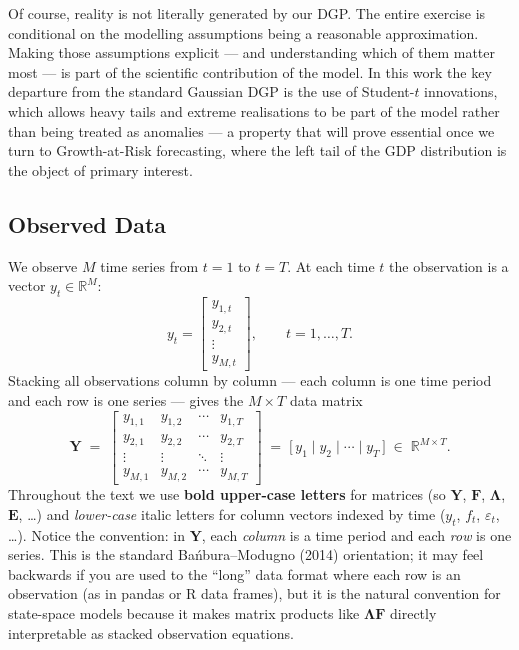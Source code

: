 \documentclass[11pt, a4paper, oneside]{article}
\newcommand{\mY}{\mathbf{Y}}
\newcommand{\mF}{\mathbf{F}}
\newcommand{\mL}{\boldsymbol{\Lambda}}
\newcommand{\mE}{\mathbf{E}}
\begin{document}
Of course, reality is not literally generated by our DGP. The entire
exercise is conditional on the modelling assumptions being a reasonable
approximation. Making those assumptions explicit — and understanding
which of them matter most — is part of the scientific contribution of
the model. In this work the key departure from the standard Gaussian DGP
is the use of Student-$t$ innovations, which allows heavy tails and
extreme realisations to be part of the model rather than being treated
as anomalies — a property that will prove essential once we turn to
Growth-at-Risk forecasting, where the left tail of the GDP distribution
is the object of primary interest.

\newpage 

\subsection{Observed Data}

We observe $M$ time series from $t=1$ to $t=T$. At each time $t$ the
observation is a vector $y_t \in \mathbb{R}^M$:
\[
y_t = 
\begin{bmatrix}
    y_{1,t} \\[2pt]
    y_{2,t} \\[2pt]
    \vdots  \\[2pt]
    y_{M,t}
\end{bmatrix},
\qquad t = 1, \ldots, T.
\]
Stacking all observations column by column — each column is one time
period and each row is one series — gives the $M \times T$ data matrix
\[
\mY \;=\;
\begin{bmatrix}
    y_{1,1} & y_{1,2} & \cdots & y_{1,T} \\[2pt]
    y_{2,1} & y_{2,2} & \cdots & y_{2,T} \\[2pt]
    \vdots  & \vdots  & \ddots & \vdots  \\[2pt]
    y_{M,1} & y_{M,2} & \cdots & y_{M,T}
\end{bmatrix}
\;=\;
\big[\, y_1 \mid y_2 \mid \cdots \mid y_T \,\big]
\;\in\; \mathbb{R}^{M \times T}.
\]
Throughout the text we use \textbf{bold upper-case letters} for matrices
(so $\mY$, $\mF$, $\mL$, $\mE$, \ldots) and \emph{lower-case} italic
letters for column vectors indexed by time ($y_t$, $f_t$, $\varepsilon_t$, \ldots).
Notice the convention: in $\mY$, each \emph{column} is a time period and 
each \emph{row} is one series. This is the standard Bańbura–Modugno (2014) 
orientation; it may feel backwards if you are used to the ``long'' data 
format where each row is an observation (as in pandas or R data frames), 
but it is the natural convention for state-space models because it makes 
matrix products like $\mL \mF$ directly interpretable as stacked 
observation equations.
\end{document}
